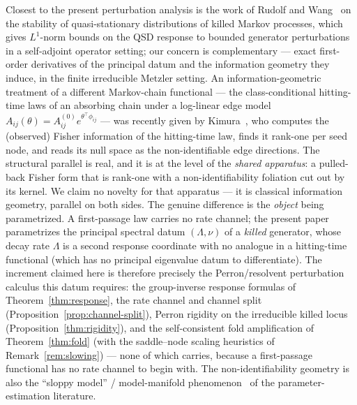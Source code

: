 \documentclass[11pt,reqno]{amsart}
\theoremstyle{plain}
\theoremstyle{definition}
\theoremstyle{remark}
\begin{document}
Closest to the present perturbation analysis is the work of Rudolf and
Wang~\cite{RudolfWang2021} on the stability of quasi-stationary distributions of
killed Markov processes, which gives $L^1$-norm bounds on the QSD response to
bounded generator perturbations in a self-adjoint operator setting; our concern is
complementary --- exact first-order derivatives of the principal datum and the
information geometry they induce, in the finite irreducible Metzler setting. An
information-geometric treatment of a different Markov-chain functional --- the
class-conditional hitting-time laws of an absorbing chain under a log-linear edge
model $A_{ij}(\theta)=A_{ij}^{(0)}e^{\theta^{\top}\phi_{ij}}$ --- was recently given
by Kimura~\cite{AbsIG2026}, who computes the (observed) Fisher information of the
hitting-time law, finds it rank-one per seed node, and reads its null space as the
non-identifiable edge directions. The structural parallel is real, and it is at the
level of the \emph{shared apparatus}: a pulled-back Fisher form that is rank-one with
a non-identifiability foliation cut out by its kernel. We claim no novelty for that
apparatus --- it is classical information geometry, parallel on both sides. The
genuine difference is the \emph{object} being parametrized. A first-passage law
carries no rate channel; the present paper parametrizes the principal spectral datum
$(\Lambda,\nu)$ of a \emph{killed} generator, whose decay rate $\Lambda$ is a second
response coordinate with no analogue in a hitting-time functional (which has no
principal eigenvalue datum to differentiate). The increment claimed here is therefore
precisely the Perron/resolvent perturbation calculus this datum requires: the
group-inverse response formulas of Theorem~\ref{thm:response}, the rate channel and
channel split (Proposition~\ref{prop:channel-split}), Perron rigidity on the
irreducible killed locus (Proposition~\ref{thm:rigidity}), and the self-consistent
fold amplification of Theorem~\ref{thm:fold} (with the saddle--node scaling heuristics
of Remark~\ref{rem:slowing}) --- none of which \cite{AbsIG2026} carries, because a
first-passage functional has no rate channel to begin with. The non-identifiability
geometry is also the ``sloppy model'' / model-manifold
phenomenon~\cite{Transtrum2015,ModelManifoldGeom} of the parameter-estimation
literature.
\end{document}
